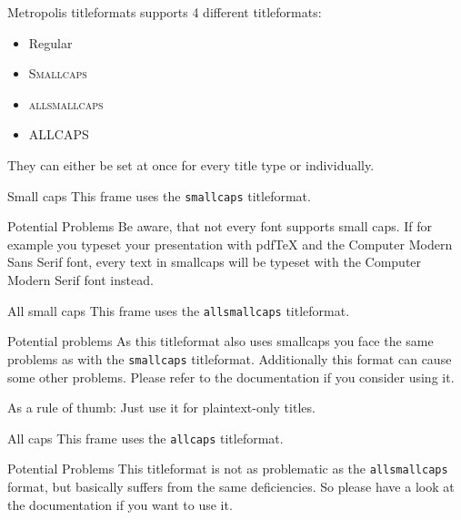 \begin{frame}{Metropolis titleformats}
	\themename supports 4 different titleformats:
	\begin{itemize}
		\item Regular
		\item \textsc{Smallcaps}
		\item \textsc{allsmallcaps}
		\item ALLCAPS
	\end{itemize}
	They can either be set at once for every title type or individually.
\end{frame}

{
\begin{frame}{Small caps}
	This frame uses the \texttt{smallcaps} titleformat.

	\begin{alertblock}{Potential Problems}
		Be aware, that not every font supports small caps. If for example you typeset your presentation with pdfTeX and the Computer Modern Sans Serif font, every text in smallcaps will be typeset with the Computer Modern Serif font instead.
	\end{alertblock}
\end{frame}
}

{
\begin{frame}{All small caps}
	This frame uses the \texttt{allsmallcaps} titleformat.

	\begin{alertblock}{Potential problems}
		As this titleformat also uses smallcaps you face the same problems as with the \texttt{smallcaps} titleformat. Additionally this format can cause some other problems. Please refer to the documentation if you consider using it.

		As a rule of thumb: Just use it for plaintext-only titles.
	\end{alertblock}
\end{frame}
}

{
\begin{frame}{All caps}
	This frame uses the \texttt{allcaps} titleformat.

	\begin{alertblock}{Potential Problems}
		This titleformat is not as problematic as the \texttt{allsmallcaps} format, but basically suffers from the same deficiencies. So please have a look at the documentation if you want to use it.
	\end{alertblock}
\end{frame}
}

